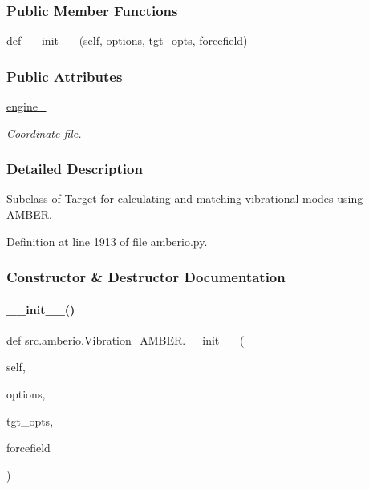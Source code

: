 \subsubsection*{Public Member Functions}
\begin{DoxyCompactItemize}
\item 
def \hyperlink{classsrc_1_1amberio_1_1Vibration__AMBER_a9519126753f991390e51a25340db28d8}{\+\_\+\+\_\+init\+\_\+\+\_\+} (self, options, tgt\+\_\+opts, forcefield)
\end{DoxyCompactItemize}
\subsubsection*{Public Attributes}
\begin{DoxyCompactItemize}
\item 
\hyperlink{classsrc_1_1amberio_1_1Vibration__AMBER_a513264003da327a62ec7fa5ad8e8ae30}{engine\+\_\+}
\begin{DoxyCompactList}\small\item\em Coordinate file. \end{DoxyCompactList}\end{DoxyCompactItemize}


\subsubsection{Detailed Description}
Subclass of Target for calculating and matching vibrational modes using \hyperlink{classsrc_1_1amberio_1_1AMBER}{A\+M\+B\+ER}. 



Definition at line 1913 of file amberio.\+py.



\subsubsection{Constructor \& Destructor Documentation}
\mbox{\label{classsrc_1_1amberio_1_1Vibration__AMBER_a9519126753f991390e51a25340db28d8}} 
\paragraph{\texorpdfstring{\+\_\+\+\_\+init\+\_\+\+\_\+()}{\_\_init\_\_()}}
{\footnotesize\ttfamily def src.\+amberio.\+Vibration\+\_\+\+A\+M\+B\+E\+R.\+\_\+\+\_\+init\+\_\+\+\_\+ (\begin{DoxyParamCaption}\item[{}]{self,  }\item[{}]{options,  }\item[{}]{tgt\+\_\+opts,  }\item[{}]{forcefield }\end{DoxyParamCaption})}



